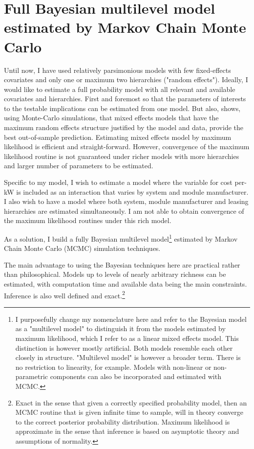 \documentclass[12pt]{article}
\begin{document}
\section{Full Bayesian multilevel model estimated by Markov Chain Monte Carlo}
Until now, I have used relatively parsimonious models with few fixed-effects covariates and only one or maximum two hierarchies ("random effects").  Ideally, I would like to estimate a full probability model with all relevant and available covariates and hierarchies. First and foremost so that the parameters of interests to the testable implications can be estimated from one model. But also, \citet{bar_random_2013} shows, using Monte-Carlo simulations, that mixed effects models that have the maximum random effects structure justified by the model and data, provide the best out-of-sample prediction. Estimating mixed effects model by maximum likelihood is efficient and straight-forward. However, convergence of the maximum likelihood routine is not guaranteed under richer models with more hierarchies and larger number of parameters to be estimated.

Specific to my model, I wish to estimate a model where the variable for cost per-kW is included as an interaction that varies by system and module manufacturer. I also wish to have a model where both system, module manufacturer and leasing hierarchies are estimated simultaneously. I am not able to obtain convergence of the maximum likelihood routines under this rich model.

As a solution, I build a fully Bayesian multilevel model\footnote{I purposefully change my nomenclature here and refer to the Bayesian model as a "multilevel model" to distinguish it from the models estimated by maximum likelihood, which I refer to as a linear mixed effects model. This distinction is however mostly artificial. Both models resemble each other closely in structure. "Multilevel model" is however a broader term. There is no restriction to linearity, for example. Models with non-linear or non-parametric components can also be incorporated and estimated with MCMC.} estimated by Markov Chain Monte Carlo (MCMC) simulation techniques.

The main advantage to using the Bayesian techniques here are practical rather than philosophical. Models up to levels of nearly arbitrary richness can be estimated, with computation time and available data being the main constraints. Inference is also well defined and exact.\footnote{Exact in the sense that given a correctly specified probability model, then an MCMC routine that is given infinite time to sample, will in theory converge to the correct posterior probability distribution. Maximum likelihood is approximate in the sense that inference is based on asymptotic theory and assumptions of normality.}
\end{document}
